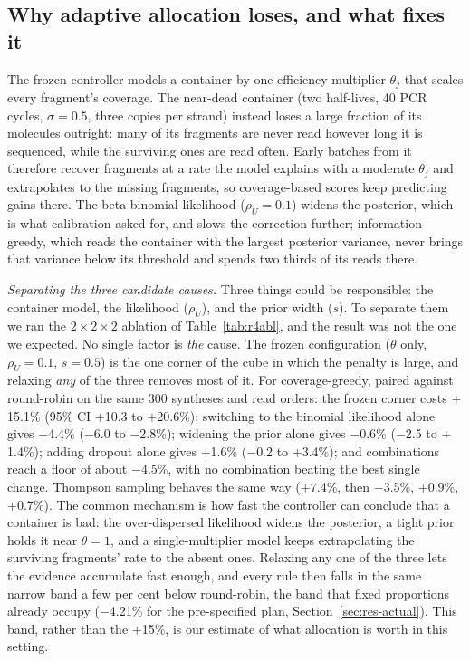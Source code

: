 \documentclass[conference,onecolumn,11pt]{IEEEtran}
\begin{document}
\subsection{Why adaptive allocation loses, and what fixes it}\label{sec:res-misspec}
The frozen controller models a container by one efficiency multiplier $\theta_j$ that scales every
fragment's coverage.  The near-dead container (two half-lives, 40 PCR cycles, $\sigma{=}0.5$, three
copies per strand) instead loses a large fraction of its molecules outright: many of its fragments are
never read however long it is sequenced, while the surviving ones are read often.  Early batches from it
therefore recover fragments at a rate the model explains with a moderate $\theta_j$ and extrapolates to
the missing fragments, so coverage-based scores keep predicting gains there.  The beta-binomial
likelihood ($\rho_U{=}0.1$) widens the posterior, which is what calibration asked for, and slows the
correction further; information-greedy, which reads the container with the largest posterior variance,
never brings that variance below its threshold and spends two thirds of its reads there.

\emph{Separating the three candidate causes.}  Three things could be responsible: the container model,
the likelihood ($\rho_U$), and the prior width ($s$).  To separate them we ran the $2\times2\times2$
ablation of Table~\ref{tab:r4abl}, and the result was not the one we expected.  No single factor is
\emph{the} cause.  The frozen configuration ($\theta$ only, $\rho_U{=}0.1$, $s{=}0.5$) is the one corner
of the cube in which the penalty is large, and relaxing \emph{any} of the three removes most of it.  For coverage-greedy, paired against
round-robin on the same 300 syntheses and read orders: the frozen corner costs $+$15.1\% (95\% CI
$+$10.3 to $+$20.6\%); switching to the binomial likelihood alone gives $-$4.4\% ($-$6.0 to $-$2.8\%);
widening the prior alone gives $-$0.6\% ($-$2.5 to $+$1.4\%); adding dropout alone gives $+$1.6\%
($-$0.2 to $+$3.4\%); and combinations reach a floor of about $-$4.5\%, with no combination beating the
best single change.  Thompson sampling behaves the same way ($+$7.4\%, then $-$3.5\%, $+$0.9\%,
$+$0.7\%).  The common mechanism is how fast the controller can conclude that a container is bad: the
over-dispersed likelihood widens the posterior, a tight prior holds it near $\theta{=}1$, and a
single-multiplier model keeps extrapolating the surviving fragments' rate to the absent ones.  Relaxing
any one of the three lets the evidence accumulate fast enough, and every rule then falls in the same
narrow band a few per cent below round-robin, the band that fixed proportions already occupy
($-$4.21\% for the pre-specified plan, Section~\ref{sec:res-actual}).  This band, rather than the
$+$15\%, is our estimate of what allocation is worth in this setting.
\end{document}
